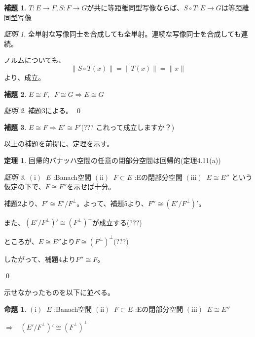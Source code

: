 \documentclass[11pt,a4paper]{amsart}
\theoremstyle{definition}
\newtheorem{thm}{定理}
\newtheorem{lem}{補題}
\newtheorem{prop}{命題}
\theoremstyle{definition}
\theoremstyle{remark}
\newtheorem{prf}{証明}
\begin{document}
\begin{lem}
$T:E \to F,S:F \to G$が共に等距離同型写像ならば、$S \circ T:E \to G$は等距離同型写像
\end{lem}

\begin{prf}
全単射な写像同士を合成しても全単射。連続な写像同士を合成しても連続。

ノルムについても、
$$\|S \circ T(x)\|
=\|T(x)\|
=\|x\|
$$
より、成立。
\end{prf}

\begin{lem}
$E \cong F, \;\; F \cong G \Longrightarrow E \cong G$
\end{lem}

\begin{prf}
補題3による。
\qed
\end{prf}

\begin{lem}
$E \cong F \Longrightarrow E' \cong F'$(??? これって成立しますか？)
\end{lem}

以上の補題を前提に、定理を示す。

\begin{thm}
回帰的バナッハ空間の任意の閉部分空間は回帰的(定理4.11(a))
\end{thm}
\begin{prf}

$\mathrm{(i)}\;\; E$ :Banach空間 \;\;\;
$\mathrm{(ii)}\;\; F \subset E$ :Eの閉部分空間  \;\;\;
$\mathrm{(iii)}\;\; E \cong E''$ \;\;\;
という仮定の下で、$F \cong F''$を示せば十分。

補題2より、$F' \cong E'/F^\bot$。よって、補題5より、$F'' \cong (E'/F^\bot)' $。

また、$(E'/F^\bot)' \cong (F^\bot)^\bot$が成立する(???)

ところが、$E \cong E''$より$F \cong (F^\bot)^\bot$(???)

したがって、補題4より$F'' \cong F$。

\qed
\end{prf}

示せなかったものを以下に並べる。

\begin{prop}
$\mathrm{(i)}\;\; E$ :Banach空間 \;\;\;
$\mathrm{(ii)}\;\; F \subset E$ :Eの閉部分空間  \;\;\;
$\mathrm{(iii)}\;\; E \cong E''$ \;\;\;

$\Longrightarrow \;\;\; (E'/F^\bot)' \cong (F^\bot)^\bot$
\end{prop}
\end{document}

